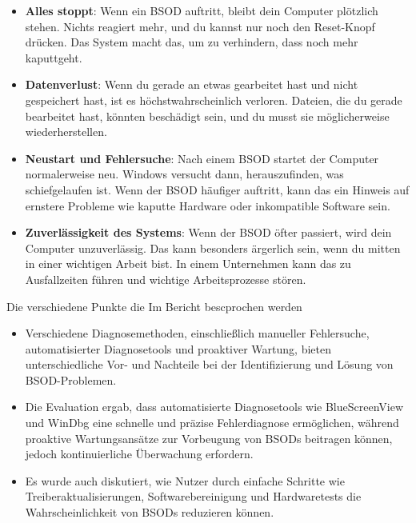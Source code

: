\documentclass[paper=a4,fontsize=12pt,ngerman,parskip=half]{scrartcl}
\begin{document}
\begin{itemize}
  \item \textbf{Alles stoppt}: Wenn ein BSOD auftritt, bleibt dein Computer plötzlich stehen. Nichts reagiert mehr, und du kannst nur noch den Reset-Knopf drücken. Das System macht das, um zu verhindern, dass noch mehr kaputtgeht.\cite{WindowsInternalsPart1,WindowsInternalsPart2}
  \item \textbf{Datenverlust}: Wenn du gerade an etwas gearbeitet hast und nicht gespeichert hast, ist es höchstwahrscheinlich verloren. Dateien, die du gerade bearbeitet hast, könnten beschädigt sein, und du musst sie möglicherweise wiederherstellen.\cite{WindowsInternalsPart1,WindowsInternalsPart2}
  \item \textbf{Neustart und Fehlersuche}: Nach einem BSOD startet der Computer normalerweise neu. Windows versucht dann, herauszufinden, was schiefgelaufen ist. Wenn der BSOD häufiger auftritt, kann das ein Hinweis auf ernstere Probleme wie kaputte Hardware oder inkompatible Software sein.\cite{WindowsInternalsPart1,WindowsInternalsPart2}
  \item \textbf{Zuverlässigkeit des Systems}: Wenn der BSOD öfter passiert, wird dein Computer unzuverlässig. Das kann besonders ärgerlich sein, wenn du mitten in einer wichtigen Arbeit bist. In einem Unternehmen kann das zu Ausfallzeiten führen und wichtige Arbeitsprozesse stören.\cite{WindowsInternalsPart1,WindowsInternalsPart2}
\end{itemize}

Die verschiedene Punkte die Im Bericht bescprochen werden
\begin{itemize}
  \item Verschiedene Diagnosemethoden, einschließlich manueller Fehlersuche, automatisierter Diagnosetools und proaktiver Wartung, bieten unterschiedliche Vor- und Nachteile bei der Identifizierung und Lösung von BSOD-Problemen.\cite{microsoft_support}
  \item Die Evaluation ergab, dass automatisierte Diagnosetools wie BlueScreenView und WinDbg eine schnelle und präzise Fehlerdiagnose ermöglichen, während proaktive Wartungsansätze zur Vorbeugung von BSODs beitragen können, jedoch kontinuierliche Überwachung erfordern.\cite{microsoft_support}
  \item Es wurde auch diskutiert, wie Nutzer durch einfache Schritte wie Treiberaktualisierungen, Softwarebereinigung und Hardwaretests die Wahrscheinlichkeit von BSODs reduzieren können.\cite{avast}
\end{itemize}
\end{document}
